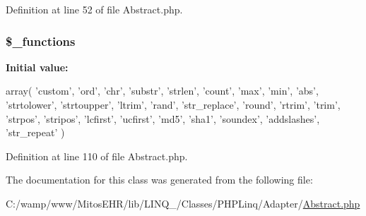\-Definition at line 52 of file \-Abstract.\-php.

\hypertarget{class_p_h_p_linq___adapter___abstract_a9e0deada4b914ed776ccf0a6c808ef78}{
\subsubsection[{\$\-\_\-functions}]{\setlength{\rightskip}{0pt plus 5cm}\$\-\_\-functions}}\label{class_p_h_p_linq___adapter___abstract_a9e0deada4b914ed776ccf0a6c808ef78}
{\bfseries \-Initial value\-:}
\begin{DoxyCode}
 array(
                'custom',
                'ord',
                'chr',
                'substr',
                'strlen',
                'count',
                'max',
                'min',
                'abs',
                'strtolower',
                'strtoupper',
                'ltrim',
                'rand',
                'str_replace',
                'round',
                'rtrim',
                'trim',
                'strpos',
                'stripos',
                'lcfirst',
                'ucfirst',
                'md5',
                'sha1',
                'soundex',
                'addslashes',
                'str_repeat'
        )
\end{DoxyCode}


\-Definition at line 110 of file \-Abstract.\-php.



\-The documentation for this class was generated from the following file\-:\begin{DoxyCompactItemize}
\item 
\-C\-:/wamp/www/\-Mitos\-E\-H\-R/lib/\-L\-I\-N\-Q\-\_/\-Classes/\-P\-H\-P\-Linq/\-Adapter/\hyperlink{_abstract_8php}{\-Abstract.\-php}\end{DoxyCompactItemize}
